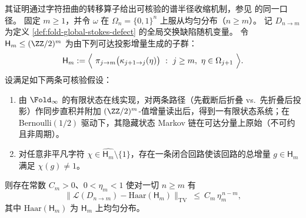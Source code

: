 \begin{theorem}\label{thm:fold-stokes-defect-haar-mixing}
其证明通过字符扭曲的转移算子给出可核验的谱半径收缩机制，参见 \cite{Internal2026FoldGeneralizedStokesDefectHaarMixing} 的同一口径。
固定 \(m\ge 1\)，并令 \(\omega\) 在 \(\Omega_n=\{0,1\}^n\) 上服从均匀分布（\(n\ge m\)）。
记 \(D_{n\to m}\) 为定义 \ref{def:fold-global-stokes-defect} 的全局交换缺陷随机变量。
令 \(\mathsf H_m\le (\ZZ/2)^m\) 为由下列可达投影增量生成的子群：
\[
\mathsf H_m
:=
\Bigl\langle\ \pi_{j\to m}\bigl(\kappa_{j+1\to j}(\eta)\bigr)\ :\ j\ge m,\ \eta\in\Omega_{j+1}\ \Bigr\rangle.
\]
设满足如下两条可核验假设：
\begin{enumerate}
  \item 由 \(\Fold_\infty\) 的有限状态在线实现，对两条路径（先截断后折叠 vs.\ 先折叠后投影）作同步直积并附加 \((\ZZ/2)^m\)-值增量读出后，得到一有限状态系统；在 Bernoulli\((1/2)\) 驱动下，其隐藏状态 Markov 链在可达分量上原始（不可约且非周期）。
  \item 对任意非平凡字符 \(\chi\in\widehat{\mathsf H_m}\setminus\{1\}\)，存在一条闭合回路使该回路的总增量 \(g\in\mathsf H_m\) 满足 \(\chi(g)\neq 1\)。
\end{enumerate}
则存在常数 \(C_m>0\)、\(0<\eta_m<1\) 使对一切 \(n\ge m\) 有
\[
\bigl\|\mathcal L(D_{n\to m})-\mathrm{Haar}(\mathsf H_m)\bigr\|_{\mathrm{TV}}
\ \le\ C_m\,\eta_m^{\,n-m},
\]
其中 \(\mathrm{Haar}(\mathsf H_m)\) 为 \(\mathsf H_m\) 上均匀分布。
\end{theorem}

